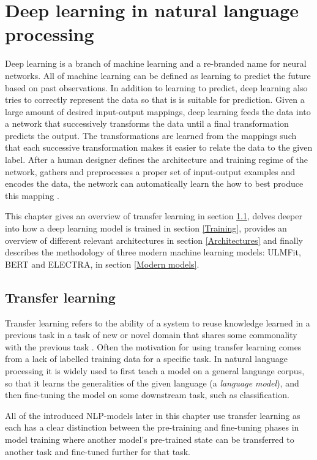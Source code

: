 \chapter{Deep learning in natural language processing} \label{Deep learning in natural language processing}
Deep learning is a branch of machine learning and a re-branded name for neural networks.
All of machine learning can be defined as learning to predict the future based on past observations.
In addition to learning to predict, deep learning also tries to correctly represent the data so that is is suitable for prediction.
Given a large amount of desired input-output mappings, deep learning feeds the data into a network that successively transforms the data until a final transformation predicts the output.
The transformations are learned from the mappings such that each successive transformation makes it easier to relate the data to the given label.
After a human designer defines the architecture and training regime of the network, gathers and preprocesses a proper set of input-output examples and encodes the data, the network can automatically learn the how to best produce this mapping \cite{goldberg2017}.

This chapter gives an overview of transfer learning in section \ref{Transfer learning}, delves deeper into how a deep learning model is trained in section \ref{Training}, provides an overview of different relevant architectures in section \ref{Architectures} and finally describes the methodology of three modern machine learning models: ULMFit, BERT and ELECTRA, in section \ref{Modern models}.

\section{Transfer learning} \label{Transfer learning}
Transfer learning refers to the ability of a system to reuse knowledge learned in a previous task in a task of new or novel domain that shares some commonality with the previous task \cite{yang2020}.
Often the motivation for using transfer learning comes from a lack of labelled training data for a specific task.
In natural language processing it is widely used to first teach a model on a general language corpus, so that it learns the generalities of the given language (a \textit{language model}), and then fine-tuning the model on some downstream task, such as classification.

All of the introduced NLP-models later in this chapter use transfer learning as each has a clear distinction between the pre-training and fine-tuning phases in model training where another model's pre-trained state can be transferred to another task and fine-tuned further for that task.

